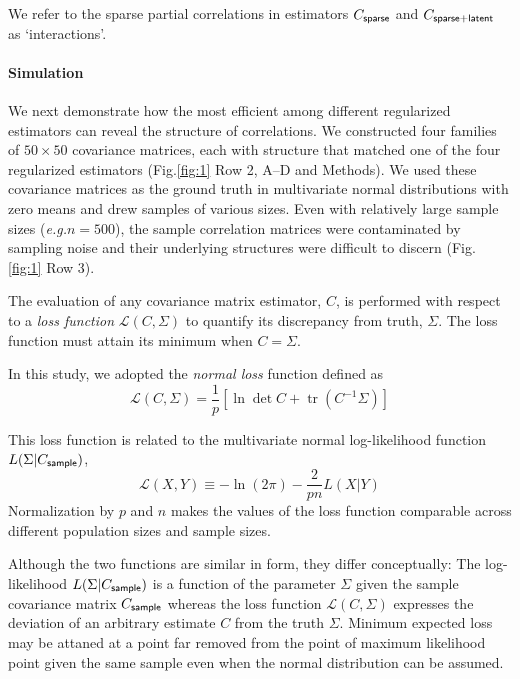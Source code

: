 \documentclass[10pt]{article}
\DeclareMathOperator{\Tr}{tr}
\newcommand{\sq}[1]{\lq#1\rq}
\newcommand{\figref}[2]{Fig.\;\ref{fig:#1}\,#2}
\newcommand{\loss}[1]{\mathcal L\left(#1\right)}
\newcommand{\eg}{\emph{e.g.}\;}
\begin{document}
We refer to the sparse partial correlations in estimators $C_{\sf sparse}$ and $C_{\sf sparse+latent}$ as \sq{interactions}.

\paragraph{Simulation}
We next demonstrate how the most efficient among different regularized estimators can reveal the structure of correlations.
We constructed four families of $50\times 50$ covariance matrices, each with structure that matched one of the four regularized estimators (\figref{1}{\,Row 2, A--D} and Methods).  We used these covariance matrices as the ground truth in multivariate normal distributions with zero means and drew samples of various sizes. Even with relatively large sample sizes (\eg $n=500$), the sample correlation matrices were contaminated by sampling noise and their underlying structures were difficult to discern (\figref{1}{\,Row 3}). 

The evaluation of any covariance matrix estimator, $C$, is performed with respect to a \emph{loss function} $\loss{C,\Sigma}$ to quantify its discrepancy from truth, $\Sigma$.  The loss function must attain its minimum when $C=\Sigma$.

In this study, we adopted the \emph{normal loss} function defined as
\begin{equation}\label{eq:loss}
    \loss{C,\Sigma} = \frac 1 p\left[\ln \det C + \Tr(C^{-1}\Sigma)\right]
\end{equation}

This loss function is related to the multivariate normal log-likelihood function $L(\Sigma|C_{\sf sample})$,
\begin{equation}
	\loss{X,Y} \equiv -\ln(2\pi) - \frac 2 {pn} L(X|Y)
\end{equation}
Normalization by $p$ and $n$ makes the values of the loss function comparable across different population sizes and sample sizes.

Although the two functions are similar in form, they differ conceptually: The log-likelihood $L(\Sigma|C_{\sf sample})$ is a function of the parameter $\Sigma$ given the sample covariance matrix $C_{\sf sample}$ whereas the loss function $\loss{C,\Sigma}$ expresses the deviation of an arbitrary estimate $C$ from the truth $\Sigma$. Minimum expected loss may be attaned at a point far removed from the point of maximum likelihood point given the same sample even when the normal distribution can be assumed.
\end{document}
